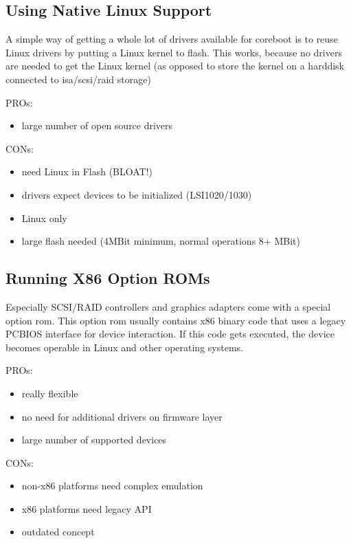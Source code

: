 \documentclass[titlepage,12pt]{article}
\begin{document}
\subsection{Using Native Linux Support}

A simple way of getting a whole lot of drivers available for coreboot
is to reuse Linux drivers by putting a Linux kernel to flash. This
works, because no drivers are needed to get the Linux kernel (as opposed
to store the kernel on a harddisk connected to isa/scsi/raid storage)

PROs:
 \begin{itemize}
 \item large number of open source drivers
 \end{itemize}

CONs:
 \begin{itemize}
 \item need Linux in Flash (BLOAT!)
 \item drivers expect devices to be initialized (LSI1020/1030)
 \item Linux only
 \item large flash needed (4MBit minimum, normal operations 8+ MBit)
 \end{itemize}


\subsection{Running X86 Option ROMs}

Especially SCSI/RAID controllers and graphics adapters come with a
special option rom. This option rom usually contains x86 binary code
that uses a legacy PCBIOS interface for device interaction. If this code
gets executed, the device becomes operable in Linux and other operating
systems.

PROs:
 \begin{itemize}
 \item really flexible
 \item no need for additional drivers on firmware layer
 \item large number of supported devices
 \end{itemize}

CONs:
 \begin{itemize}
 \item non-x86 platforms need complex emulation
 \item x86 platforms need legacy API
 \item outdated concept
 \end{itemize}
\end{document}

